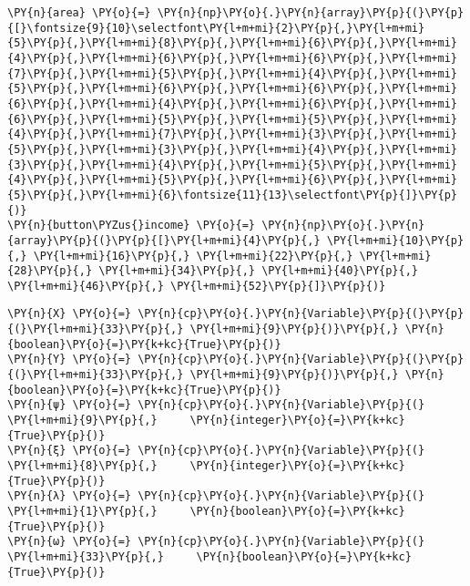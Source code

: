 \begin{tcolorbox}[breakable, size=fbox, boxrule=1pt, pad at break*=1mm,colback=cellbackground, colframe=cellborder]
\begin{Verbatim}[commandchars=\\\{\}]
\PY{n}{area} \PY{o}{=} \PY{n}{np}\PY{o}{.}\PY{n}{array}\PY{p}{(}\PY{p}{[}\fontsize{9}{10}\selectfont\PY{l+m+mi}{2}\PY{p}{,}\PY{l+m+mi}{5}\PY{p}{,}\PY{l+m+mi}{8}\PY{p}{,}\PY{l+m+mi}{6}\PY{p}{,}\PY{l+m+mi}{4}\PY{p}{,}\PY{l+m+mi}{6}\PY{p}{,}\PY{l+m+mi}{6}\PY{p}{,}\PY{l+m+mi}{7}\PY{p}{,}\PY{l+m+mi}{5}\PY{p}{,}\PY{l+m+mi}{4}\PY{p}{,}\PY{l+m+mi}{5}\PY{p}{,}\PY{l+m+mi}{6}\PY{p}{,}\PY{l+m+mi}{6}\PY{p}{,}\PY{l+m+mi}{6}\PY{p}{,}\PY{l+m+mi}{4}\PY{p}{,}\PY{l+m+mi}{6}\PY{p}{,}\PY{l+m+mi}{6}\PY{p}{,}\PY{l+m+mi}{5}\PY{p}{,}\PY{l+m+mi}{5}\PY{p}{,}\PY{l+m+mi}{4}\PY{p}{,}\PY{l+m+mi}{7}\PY{p}{,}\PY{l+m+mi}{3}\PY{p}{,}\PY{l+m+mi}{5}\PY{p}{,}\PY{l+m+mi}{3}\PY{p}{,}\PY{l+m+mi}{4}\PY{p}{,}\PY{l+m+mi}{3}\PY{p}{,}\PY{l+m+mi}{4}\PY{p}{,}\PY{l+m+mi}{5}\PY{p}{,}\PY{l+m+mi}{4}\PY{p}{,}\PY{l+m+mi}{5}\PY{p}{,}\PY{l+m+mi}{6}\PY{p}{,}\PY{l+m+mi}{5}\PY{p}{,}\PY{l+m+mi}{6}\fontsize{11}{13}\selectfont\PY{p}{]}\PY{p}{)}
\PY{n}{button\PYZus{}income} \PY{o}{=} \PY{n}{np}\PY{o}{.}\PY{n}{array}\PY{p}{(}\PY{p}{[}\PY{l+m+mi}{4}\PY{p}{,} \PY{l+m+mi}{10}\PY{p}{,} \PY{l+m+mi}{16}\PY{p}{,} \PY{l+m+mi}{22}\PY{p}{,} \PY{l+m+mi}{28}\PY{p}{,} \PY{l+m+mi}{34}\PY{p}{,} \PY{l+m+mi}{40}\PY{p}{,} \PY{l+m+mi}{46}\PY{p}{,} \PY{l+m+mi}{52}\PY{p}{]}\PY{p}{)}
    \end{Verbatim}
\end{tcolorbox}

\fontsize{10.95}{13.6}\selectfont

\begin{tcolorbox}[breakable, size=fbox, boxrule=1pt, pad at break*=1mm,colback=cellbackground, colframe=cellborder]
    \begin{Verbatim}[commandchars=\\\{\}]
\PY{n}{X} \PY{o}{=} \PY{n}{cp}\PY{o}{.}\PY{n}{Variable}\PY{p}{(}\PY{p}{(}\PY{l+m+mi}{33}\PY{p}{,} \PY{l+m+mi}{9}\PY{p}{)}\PY{p}{,} \PY{n}{boolean}\PY{o}{=}\PY{k+kc}{True}\PY{p}{)}
\PY{n}{Y} \PY{o}{=} \PY{n}{cp}\PY{o}{.}\PY{n}{Variable}\PY{p}{(}\PY{p}{(}\PY{l+m+mi}{33}\PY{p}{,} \PY{l+m+mi}{9}\PY{p}{)}\PY{p}{,} \PY{n}{boolean}\PY{o}{=}\PY{k+kc}{True}\PY{p}{)}
\PY{n}{ψ} \PY{o}{=} \PY{n}{cp}\PY{o}{.}\PY{n}{Variable}\PY{p}{(}  \PY{l+m+mi}{9}\PY{p}{,}     \PY{n}{integer}\PY{o}{=}\PY{k+kc}{True}\PY{p}{)}
\PY{n}{ξ} \PY{o}{=} \PY{n}{cp}\PY{o}{.}\PY{n}{Variable}\PY{p}{(}  \PY{l+m+mi}{8}\PY{p}{,}     \PY{n}{integer}\PY{o}{=}\PY{k+kc}{True}\PY{p}{)}
\PY{n}{λ} \PY{o}{=} \PY{n}{cp}\PY{o}{.}\PY{n}{Variable}\PY{p}{(}  \PY{l+m+mi}{1}\PY{p}{,}     \PY{n}{boolean}\PY{o}{=}\PY{k+kc}{True}\PY{p}{)}
\PY{n}{ω} \PY{o}{=} \PY{n}{cp}\PY{o}{.}\PY{n}{Variable}\PY{p}{(} \PY{l+m+mi}{33}\PY{p}{,}     \PY{n}{boolean}\PY{o}{=}\PY{k+kc}{True}\PY{p}{)}
    \end{Verbatim}
\end{tcolorbox}

